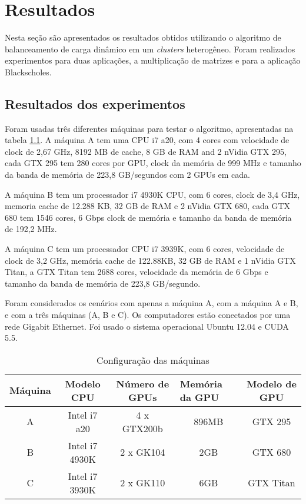 \pagestyle{empty}
\cleardoublepage
\pagestyle{fancy}

\onehalfspacing

\chapter{Resultados}\label{cap6}

Nesta seção são apresentados os resultados obtidos utilizando o algoritmo de balanceamento de carga dinâmico em um \emph{clusters} heterogêneo. Foram realizados experimentos para duas aplicações, a multiplicação de matrizes e para a aplicação Blackscholes. 

\section{Resultados dos experimentos}\label{cap6:intro}

Foram usadas três diferentes máquinas para testar o algoritmo, apresentadas na tabela \ref{table: machines}. A máquina A tem uma CPU i7 a20, com 4 cores com velocidade de clock de 2,67 GHz, 8192 MB de cache, 8 GB de RAM and 2 nVidia GTX 295, cada GTX 295 tem 280 cores por GPU, clock da memória de 999 MHz e tamanho da banda de memória de 223,8 GB/segundos com 2 GPUs em cada. 

A máquina B  tem um processador i7 4930K CPU, com 6 cores, clock de 3,4 GHz, memoria cache de 12.288 KB, 32 GB de RAM e 2 nVidia GTX 680, cada GTX 680 tem 1546 cores, 6 Gbps clock de memória e tamanho da banda de memória de 192,2 MHz. 

A máquina C tem um processador CPU i7 3939K, com 6 cores, velocidade de clock de 3,2 GHz, memória cache de 122.88KB, 32 GB de RAM e 1 nVidia GTX Titan, a GTX Titan tem 2688 cores, velocidade da memória de 6 Gbps e tamanho da banda de memória de 223,8 GB/segundo. 

Foram considerados os cenários com apenas a máquina A, com a máquina A e B, e com a três máquinas (A, B e C). Os computadores estão conectados por uma rede Gigabit Ethernet. Foi usado o sistema operacional Ubuntu 12.04 e CUDA 5.5.


\begin{table}[htt]
\centering
\tiny
\caption{Configuração das máquinas}

\begin{tabular}{|c|c|c|c|c|}
\hline
\multicolumn{1}{|l|}{Máquina} & Modelo CPU  & Número de GPUs & \multicolumn{1}{l|}{Memória da GPU } & Modelo de GPU \\ \hline
A                             & Intel i7 a20   & 4 x GTX200b         & 896MB                          & GTX 295   \\ \hline
B                             & Intel i7 4930K  & 2 x GK104           & 2GB                            & GTX 680   \\ \hline
C                             & Intel i7 3930K & 2 x GK110     & 6GB                            & GTX Titan \\ \hline
\end{tabular}
\label{table: machines}
\end{table}


